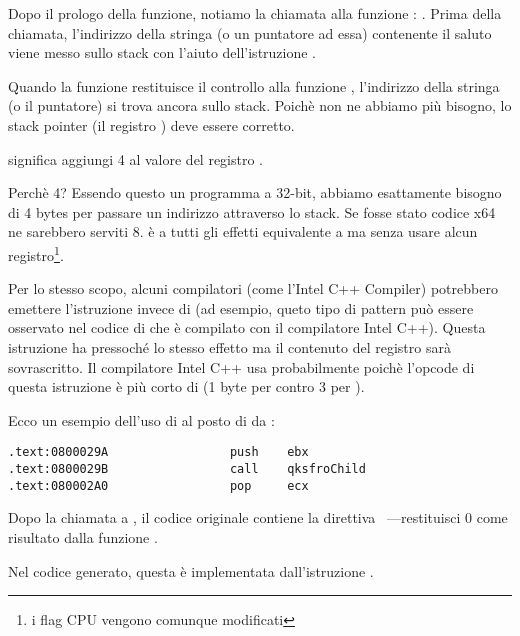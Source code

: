 Dopo il prologo della funzione, notiamo la chiamata alla funzione \printf{} : .
Prima della chiamata, l'indirizzo della stringa (o un puntatore ad essa) contenente il saluto viene messo sullo stack con l'aiuto dell'istruzione \PUSH.

Quando la funzione \printf restituisce il controllo alla funzione \main , l'indirizzo della stringa (o il puntatore) si trova ancora sullo stack.
Poichè non ne abbiamo più bisogno, lo \gls{stack pointer} (il registro \ESP ) deve essere corretto.

 significa aggiungi 4 al valore del registro \ESP.

Perchè 4? Essendo questo un programma a 32-bit, abbiamo esattamente bisogno di 4 bytes per passare un indirizzo attraverso lo stack. Se fosse stato codice x64 ne sarebbero serviti 8.
 è a tutti gli effetti equivalente a  ma senza usare alcun registro\footnote{i flag CPU vengono comunque modificati}.

\myindex{\oracle}

Per lo stesso scopo, alcuni compilatori (come l'Intel C++ Compiler) potrebbero emettere l'istruzione 
invece di \ADD (ad esempio, queto tipo di pattern può essere osservato nel codice di \oracle{} che è compilato con il compilatore Intel C++).
Questa istruzione ha pressoché lo stesso effetto ma il contenuto del registro \ECX sarà sovrascritto.
Il compilatore Intel C++ usa probabilmente  poichè l'opcode di questa istruzione è più corto di  (1 byte per  contro 3 per ).

Ecco un esempio dell'uso di \POP al posto di \ADD da \oracle{}:

\begin{lstlisting}[caption=\oracle 10.2 Linux (\ITAph{}),style=customasmx86]
.text:0800029A                 push    ebx
.text:0800029B                 call    qksfroChild
.text:080002A0                 pop     ecx
\end{lstlisting}

Dopo la chiamata a \printf, il codice \CCpp originale contiene la direttiva ~---restituisci 0 come risultato dalla funzione \main.

Nel codice generato, questa è implementata dall'istruzione .


